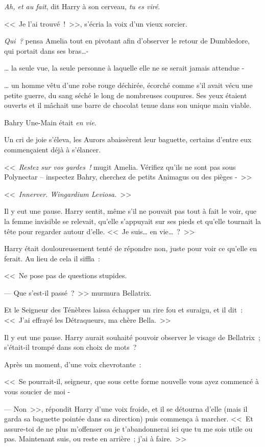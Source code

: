 \emph{Ah, et au fait}, dit Harry à son cerveau, \emph{tu es viré}.

\later

<<~Je l'ai trouvé~!~>>, s'écria la voix d'un vieux sorcier.

\emph{Qui~?} pensa Amelia tout en pivotant afin d'observer le retour de Dumbledore, qui portait dans ses bras…-

… la seule vue, la seule personne à laquelle elle ne se serait jamais attendue -

… un homme vêtu d'une robe rouge déchirée, écorché comme s'il avait vécu une petite guerre, du sang séché le long de nombreuses coupures. Ses yeux étaient ouverts et il mâchait une barre de chocolat tenue dans son unique main viable.

Bahry Une-Main était \emph{en vie}.

Un cri de joie s'éleva, les Aurors abaissèrent leur baguette, certains d'entre eux commençaient déjà à s'élancer.

<<~\emph{Restez sur vos gardes~!} mugit Amelia. Vérifiez qu'ils ne sont pas sous Polynectar -- inspectez Bahry, cherchez de petits Animagus ou des pièges -~>>

\later

<<~\emph{Innerver. Wingardium Leviosa.}~>>

Il y eut une pause. Harry sentit, même s'il ne pouvait pas tout à fait le voir, que la femme invisible se relevait, qu'elle s'appuyait sur ses pieds et qu'elle tournait la tête pour regarder autour d'elle. <<~Je suis… en vie…~?~>>

Harry était douloureusement tenté de répondre non, juste pour voir ce qu'elle en ferait. Au lieu de cela il siffla~:

<<~Ne pose pas de questions stupides.

--- Que s'est-il passé~?~>> murmura Bellatrix.

Et le Seigneur des Ténèbres laissa échapper un rire fou et suraigu, et il dit~: <<~J'ai effrayé les Détraqueurs, ma chère Bella.~>>

Il y eut une pause. Harry aurait souhaité pouvoir observer le visage de Bellatrix~; s'était-il trompé dans son choix de mots~?

Après un moment, d'une voix chevrotante~:

<<~Se pourrait-il, seigneur, que sous cette forme nouvelle vous ayez commencé à vous soucier de moi -

--- Non~>>, répondit Harry d'une voix froide, et il se détourna d'elle (mais il garda sa baguette pointée dans sa direction) puis commença à marcher. <<~Et assure-toi de ne plus m'offenser ou je t'abandonnerai ici que tu me sois utile ou pas. Maintenant suis, ou reste en arrière~; j'ai à faire.~>>

